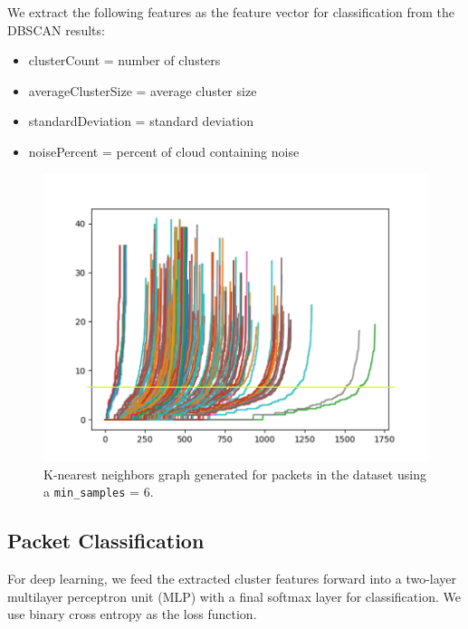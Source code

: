 We extract the following features as the feature vector for classification from the DBSCAN results:
\begin{itemize}
    \item clusterCount = number of clusters
    \item averageClusterSize = average cluster size
    \item standardDeviation = standard deviation
    \item noisePercent = percent of cloud containing noise
\end{itemize}

\begin{figure} [ht!]
\includegraphics[width=\linewidth]{chapters/6/img/kmembersgraph.png}
\caption{K-nearest neighbors graph generated for packets in the dataset using a \texttt{min\_samples} = 6.}
\label{fig:kneighborsgraph}
\end{figure}

\subsection{Packet Classification}
For deep learning, we feed the extracted cluster features forward into a two-layer multilayer perceptron unit (MLP) with a final softmax layer for classification. We use binary cross entropy as the loss function.
